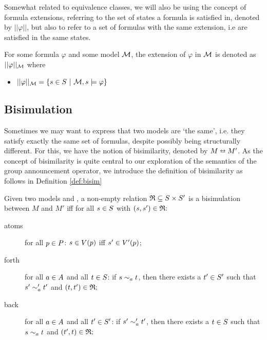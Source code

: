 Somewhat related to equivalence classes, we will also be using the concept of formula extensions, referring to the set of states a formula is satisfied in, denoted by $||\varphi||$, but also to refer to a set of formulas with the same extension, i.e are satisfied in the same states.

\begin{definition}
	\label{def:ext}
	For some formula $\varphi$ and some model $\mathcal{M}$, the extension of $\varphi$ in $\mathcal{M}$ is denoted as $||\varphi||_{\mathcal{M}}$ where 
	\begin{itemize}
		\item[] $||\varphi||_{\mathcal{M}} = \{s\in S ~|~\mathcal{M},s\models\varphi\}$
	\end{itemize}
\end{definition}

\subsection{Bisimulation}


Sometimes we may want to express that two models are `the same', i.e. they satisfy exactly the same set of formulas, despite possibly being structurally different. For this, we have the notion of bisimilarity, denoted by $M \leftrightarroweq M'$. As the concept of bisimilarity is quite central to our exploration of the semantics of the group announcement operator, we introduce the definition of bisimilarity as follows in Definition \ref{def:bisim}

\begin{definition}[Bisimulation]\label{def:bisim}
	Given two models \model{} and , a non-empty relation $\mathfrak{R}\subseteq S \times S '$  is a bisimulation between $M$ and $M'$ iff for all $s \in S$ with $(s,s') \in \mathfrak{R}\mathfrak{:}$
	\begin{description}
		\item[atoms] for all $p \in P$: $s\in V(p)$ iff $s'\in V '(p)$;
		\item[forth]  for all $a \in A$ and all $t \in S$: if $s\sim_a t$, then there exists a $t'\in S '$ such that $s'\sim'_a t'$ and $(t,t')\in\mathfrak{R}\mathfrak{;}$
		\item[back] for all $a \in A$ and all $t' \in S'$: if $s'\sim'_a t'$, then there exists a $t\in S $ such that $s\sim_a t$ and $(t',t)\in\mathfrak{R}\mathfrak{;}$
	\end{description}
\end{definition} 

